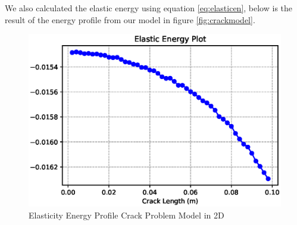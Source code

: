 \documentclass[a4paper,11pt]{article}
\begin{document}
\newline
We also calculated the elastic energy using equation \eqref{eq:elasticen}, below is the result of the energy profile from our model in figure \ref{fig:crackmodel}.
\begin{figure}[h!]
	\centering
	\includegraphics[width=0.8\linewidth]{picture/conference/elastic}
	\caption{Elasticity Energy Profile Crack Problem Model in 2D}
	\label{fig:elasticenergy}
\end{figure}
\end{document}

